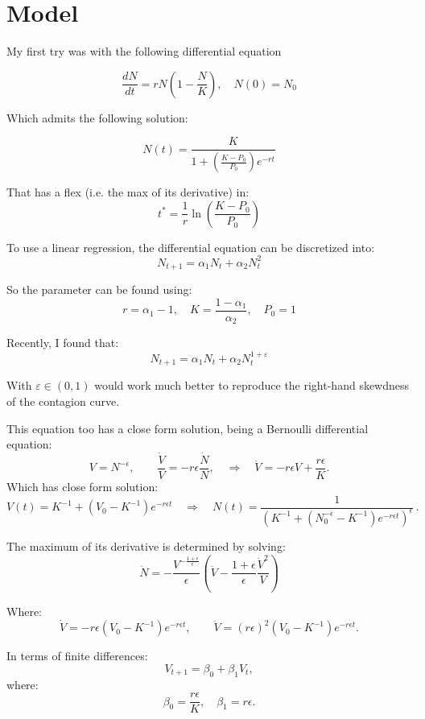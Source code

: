 \documentclass[11pt]{article}
\begin{document}
    \section{Model}
My first try was with the following differential equation

$$\frac{dN}{dt} = r N \left(1-\frac{N}{K}\right), \quad N(0)=N_0$$

Which admits the following solution:

$$N(t) = \frac{K}{1+ \left(\frac{K-P_0}{P_0}\right) e^{-rt}}$$

That has a flex (i.e. the max of its derivative) in:
$$ t^* = \frac{1}{r}\ln \left(\frac{K-P_0}{P_0}\right)$$

To use a linear regression, the differential equation can be discretized into:
$$ N_{t+1} = \alpha_1 N_t + \alpha_2 N_{t}^2$$

So the parameter can be found using:
$$ r = \alpha_1-1, \quad K= \frac{1-\alpha_1}{\alpha_2}, \quad P_0 = 1$$

Recently, I found that:
\begin{equation}
    N_{t+1} = \alpha_1 N_t + \alpha_2 N_{t}^{1 + \varepsilon}
\end{equation}

With $\varepsilon \in (0,1)$ would work much better to reproduce the right-hand skewdness of the contagion curve.

This equation too has a close form solution, being a Bernoulli differential equation:
$$V = N^{-\epsilon}, \qquad \frac{\dot V}{V} = -r \epsilon \frac{\dot N}{N}, \quad \Rightarrow \quad \dot V = -r\epsilon V + \frac{r\epsilon}{K}. $$
Which has close form solution:
$$ V(t) = K^{-1} + \left(V_0-K^{-1}\right)e^{-r\epsilon t} \quad \Rightarrow \quad N(t)=\frac{1}{\left(K^{-1} + \left(N_0^{-\epsilon}-K^{-1}\right)e^{-r\epsilon t}\right)^\epsilon}\,.$$

The maximum of its derivative is determined by solving:
$$ \ddot N = -\frac{V^{-\frac{1+\epsilon}{\epsilon}}}{\epsilon} \left(\ddot V -\frac{1+\epsilon}{\epsilon} \frac{\dot V ^2}{V}\right)$$

Where:
$$ \dot V = -r\epsilon\left(V_0-K^{-1}\right)e^{-r\epsilon t}, \qquad \ddot V = (r\epsilon)^2 \left(V_0-K^{-1}\right)e^{-r\epsilon t}. $$

In terms of finite differences:
$$ V_{t+1} = \beta_0 + \beta_1 V_t,$$
where:
$$\beta_0 = \frac{r \epsilon}{K}, \quad \beta_1=  r\epsilon.$$
\end{document}
